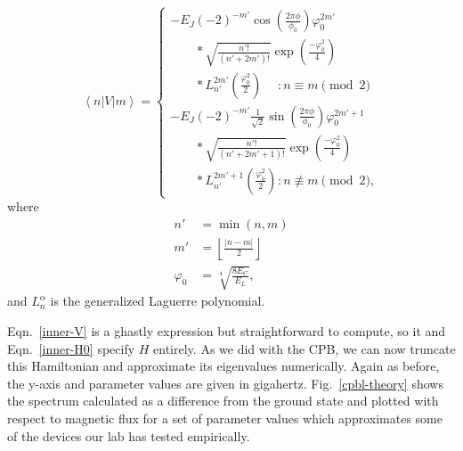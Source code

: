 \documentclass[twocolumn]{revtex4}
\newcommand{\innerp}[3]{\textstyle\left< #1 \left| #2 \right| #3 \right>}
\begin{document}
\begin{equation}
  \innerp{n}{V}{m} = \left\{\begin{array}{l}
      -E_J(-2)^{-m'}\cos\left(\frac{2\pi\phi}{\phi_0}\right)\varphi_0^{2m'}\\
      \phantom{-E_J}*\sqrt{\frac{n'!}{(n'+2m')!}}
      \exp\left(\frac{-\varphi_0^2}{4}\right)\\
      \phantom{-E_J}*L_{n'}^{2m'}\left(\frac{\varphi_0^2}{2}\right)
      \phantom{{}^{{}+1}} : n \equiv m \pmod{2} \\
      -E_J(-2)^{-m'}\frac{1}{\sqrt{2}}\sin\left(\frac{2\pi\phi}{\phi_0}\right)\varphi_0^{2m'+1}\\
      \phantom{-E_J}*\sqrt{\frac{n'!}{(n'+2m'+1)!}}
      \exp\left(\frac{-\varphi_0^2}{4}\right)\\
      \phantom{-E_J}*L_{n'}^{2m'+1}\left(\frac{\varphi_0^2}{2}\right)
      \phantom{{}^{{}}} : n \not\equiv m \pmod{2},
\end{array}\right.
\label{inner-V}
\end{equation}
where
\begin{align}
  n'& =\min(n,m)\\
  m'&=\left\lfloor\frac{|n-m|}{2}\right\rfloor \\
  \varphi_0 &=\sqrt[4]{\frac{8E_C}{E_L}},
\end{align}
and $L_n^\alpha$ is the generalized Laguerre polynomial.

Eqn.~\ref{inner-V} is a ghastly expression but straightforward to
compute, so it and Eqn.~\ref{inner-H0} specify $H$ entirely. As we did
with the CPB, we can now truncate this Hamiltonian and approximate its
eigenvalues numerically. Again as before, the y-axis and parameter
values are given in gigahertz. Fig.~\ref{cpbl-theory} shows the
spectrum calculated as a difference from the ground state and plotted
with respect to magnetic flux for a set of parameter values which
approximates some of the devices our lab has tested empirically.
\end{document}
